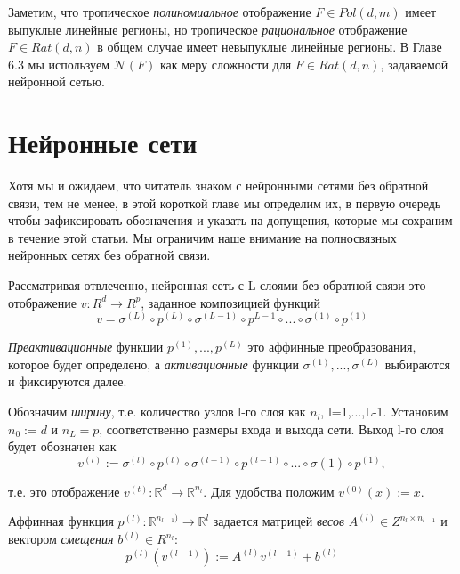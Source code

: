 \documentclass[russian]{lecture-notes}
\begin{document}
	Заметим, что тропическое \textit{полиномиальное} отображение $F \in Pol(d, m)$ имеет выпуклые линейные регионы, но тропическое \textit{рациональное} отображение $F \in Rat(d, n)$ в общем случае имеет невыпуклые линейные регионы. В Главе 6.3 мы используем $\mathcal{N}(F)$ как меру сложности для $F \in Rat(d, n)$, задаваемой нейронной сетью.
	 
			
	\section{Нейронные сети}
	
	Хотя мы и ожидаем, что читатель знаком с нейронными сетями без обратной связи, тем не менее, в этой короткой главе мы определим их, в первую очередь чтобы зафиксировать обозначения и указать на допущения, которые мы сохраним в течение этой статьи. Мы ограничим наше внимание на полносвязных нейронных сетях без обратной связи.
	
	Рассматривая отвлеченно, нейронная сеть с L-слоями без обратной связи это отображение $v : R^d \to R^p$, заданное композицией функций
	\begin{equation*}
		v = \sigma^{(L)} \circ p^{(L)} \circ \sigma^{(L-1)} \circ p^{L-1} \circ ... \circ \sigma^{(1)} \circ p^{(1)}
	\end{equation*}
	
	\textit{Преактивационные} функции $p^{(1)},...,p^{(L)}$ это аффинные преобразования, которое будет определено, а \textit{активационные} функции $\sigma^{(1)},...,\sigma^{(L)}$ выбираются и фиксируются далее.
	
	Обозначим \textit{ширину}, т.е. количество узлов l-го слоя как $n_l$, l=1,...,L-1. Установим $n_0 := d$ и $n_L = p$, соответственно размеры входа и выхода сети. Выход l-го слоя будет обозначен как
	\begin{equation*}
		v^{(l)} := \sigma^{(l)} \circ p^{(l)} \circ \sigma^{(l-1)} \circ p^{(l-1)} \circ ... \circ \sigma{(1)} \circ p^{(1)},
	\end{equation*}
	
	т.е. это отображение $v^{(t)} : \mathbb{R}^d \to \mathbb{R}^{n_l}$. Для удобства положим $v^{(0)}(x) := x$.
	
	Аффинная функция $p^{(l)} : \mathbb{R}^{n_{l-1})} \to \mathbb{R}^l$ задается матрицей \textit{весов} $A^{(l)} \in Z^{n_l \times n_{l-1}}$ и вектором \textit{смещения} $b^{(l)} \in R^{n_l}$:
	\begin{equation*}
		p^{(l)}(v^{(l-1)}) := A^{(l)}v^{(l-1)} + b^{(l)}
	\end{equation*}
	
\end{document}
